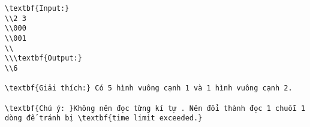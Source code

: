\begin{verbatim}
\textbf{Input:}
\\2 3
\\000
\\001
\\
\\\textbf{Output:}
\\6

\textbf{Giải thích:} Có 5 hình vuông cạnh 1 và 1 hình vuông cạnh 2.

\textbf{Chú ý: }Không nên đọc từng kí tự . Nên đổi thành đọc 1 chuỗi 1 dòng để tránh bị \textbf{time limit exceeded.}\end{verbatim}
